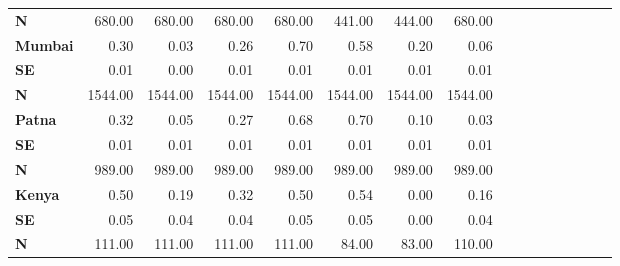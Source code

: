 \begin{tabular}{@{\extracolsep{5pt}}lrrrrrrrrrrrrrrr}
{\bf N} & 680.00\phantom{***} & 680.00\phantom{***} & 680.00\phantom{***} & 680.00\phantom{***} & 441.00\phantom{***} & 444.00\phantom{***} & 680.00\phantom{***} \\
{\bf Mumbai} & 0.30\phantom{***} & 0.03\phantom{***} & 0.26\phantom{***} & 0.70\phantom{***} & 0.58\phantom{***} & 0.20\phantom{***} & 0.06\phantom{***} \\
{\bf SE} & 0.01\phantom{***} & 0.00\phantom{***} & 0.01\phantom{***} & 0.01\phantom{***} & 0.01\phantom{***} & 0.01\phantom{***} & 0.01\phantom{***} \\
{\bf N} & 1544.00\phantom{***} & 1544.00\phantom{***} & 1544.00\phantom{***} & 1544.00\phantom{***} & 1544.00\phantom{***} & 1544.00\phantom{***} & 1544.00\phantom{***} \\
{\bf Patna} & 0.32\phantom{***} & 0.05\phantom{***} & 0.27\phantom{***} & 0.68\phantom{***} & 0.70\phantom{***} & 0.10\phantom{***} & 0.03\phantom{***} \\
{\bf SE} & 0.01\phantom{***} & 0.01\phantom{***} & 0.01\phantom{***} & 0.01\phantom{***} & 0.01\phantom{***} & 0.01\phantom{***} & 0.01\phantom{***} \\
{\bf N} & 989.00\phantom{***} & 989.00\phantom{***} & 989.00\phantom{***} & 989.00\phantom{***} & 989.00\phantom{***} & 989.00\phantom{***} & 989.00\phantom{***} \\
{\bf Kenya} & 0.50\phantom{***} & 0.19\phantom{***} & 0.32\phantom{***} & 0.50\phantom{***} & 0.54\phantom{***} & 0.00\phantom{***} & 0.16\phantom{***} \\
{\bf SE} & 0.05\phantom{***} & 0.04\phantom{***} & 0.04\phantom{***} & 0.05\phantom{***} & 0.05\phantom{***} & 0.00\phantom{***} & 0.04\phantom{***} \\
{\bf N} & 111.00\phantom{***} & 111.00\phantom{***} & 111.00\phantom{***} & 111.00\phantom{***} & 84.00\phantom{***} & 83.00\phantom{***} & 110.00\phantom{***} \\
\hline
\end{tabular}

